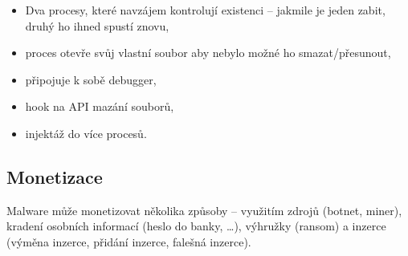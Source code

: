 \begin{itemize}
    \item Dva procesy, které navzájem kontrolují existenci -- jakmile je jeden zabit, druhý ho ihned spustí znovu,
    \item proces otevře svůj vlastní soubor aby nebylo možné ho smazat/přesunout,
    \item připojuje k sobě debugger,
    \item hook na API mazání souborů,
    \item injektáž do více procesů.
\end{itemize}

\subsection*{Monetizace}

Malware může monetizovat několika způsoby -- využitím zdrojů (botnet, miner), kradení osobních informací (heslo do banky, \dots), výhružky (ransom) a inzerce (výměna inzerce, přidání inzerce, falešná inzerce).
